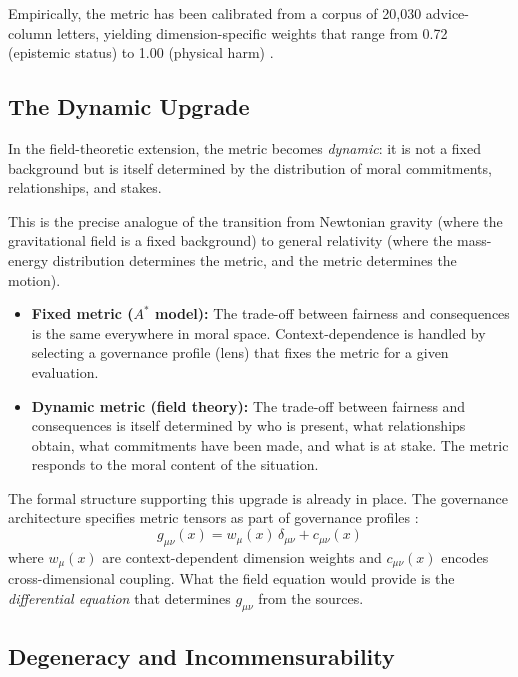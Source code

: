 \documentclass[12pt]{article}
\theoremstyle{definition}
\theoremstyle{remark}
\begin{document}
Empirically, the metric has been calibrated from a corpus of 20,030 advice-column letters, yielding dimension-specific weights that range from 0.72 (epistemic status) to 1.00 (physical harm) \citep{anonymous2026ge}.

\subsection{The Dynamic Upgrade}

In the field-theoretic extension, the metric becomes \emph{dynamic}: it is not a fixed background but is itself determined by the distribution of moral commitments, relationships, and stakes.

This is the precise analogue of the transition from Newtonian gravity (where the gravitational field is a fixed background) to general relativity (where the mass-energy distribution determines the metric, and the metric determines the motion).

\begin{itemize}
    \item \textbf{Fixed metric ($A^*$ model):} The trade-off between fairness and consequences is the same everywhere in moral space. Context-dependence is handled by selecting a governance profile (lens) that fixes the metric for a given evaluation.
    \item \textbf{Dynamic metric (field theory):} The trade-off between fairness and consequences is itself determined by who is present, what relationships obtain, what commitments have been made, and what is at stake. The metric responds to the moral content of the situation.
\end{itemize}

The formal structure supporting this upgrade is already in place. The governance architecture specifies metric tensors as part of governance profiles \citep[Ch.~18]{anonymous2026ge}:
\begin{equation}
g_{\mu\nu}(x) = w_\mu(x)\, \delta_{\mu\nu} + c_{\mu\nu}(x)
\end{equation}
where $w_\mu(x)$ are context-dependent dimension weights and $c_{\mu\nu}(x)$ encodes cross-dimensional coupling. What the field equation would provide is the \emph{differential equation} that determines $g_{\mu\nu}$ from the sources.

\subsection{Degeneracy and Incommensurability}
\end{document}
